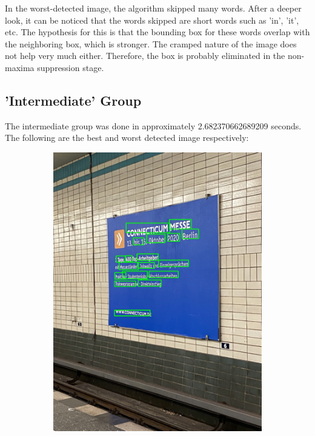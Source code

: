 \documentclass[10pt, a4paper]{article}
\begin{document}
In the worst-detected image, the algorithm skipped many words. After a deeper look, it can be noticed that the words skipped are short words such as 'in', 'it', etc. The hypothesis for this is that the bounding box for these words overlap with the neighboring box, which is stronger. The cramped nature of the image does not help very much either. Therefore, the box is probably eliminated in the non-maxima suppression stage.
\subsection{'Intermediate' Group} %
\label{sub:inter}
The intermediate group was done in approximately 2.682370662689209 seconds. The following are the best and worst detected image respectively:
\begin{figure}[h!]
	\centering
	\begin{subfigure}[b]{0.4\linewidth}
		\includegraphics[width=\linewidth]{jupyter/results/inter/sample_output_3.jpeg}

\end{subfigure}
\end{figure}
\end{document}
